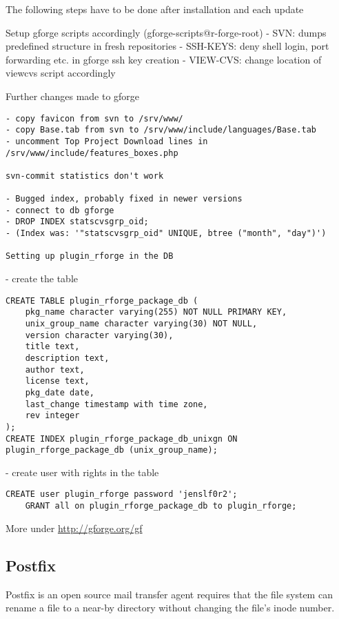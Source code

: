 \documentclass[a4paper]{article}
\begin{document}
The following steps have to be done after installation and each update

Setup gforge scripts accordingly (gforge-scripts@r-forge-root)
- SVN: dumps predefined structure in fresh repositories
- SSH-KEYS: deny shell login, port forwarding etc. in gforge ssh key creation
- VIEW-CVS: change location of viewcvs script accordingly

Further changes made to gforge
\begin{lstlisting}
- copy favicon from svn to /srv/www/
- copy Base.tab from svn to /srv/www/include/languages/Base.tab
- uncomment Top Project Download lines in /srv/www/include/features_boxes.php 

svn-commit statistics don't work

- Bugged index, probably fixed in newer versions
- connect to db gforge
- DROP INDEX statscvsgrp_oid;
- (Index was: '"statscvsgrp_oid" UNIQUE, btree ("month", "day")')

Setting up plugin_rforge in the DB
\end{lstlisting}
- create the table

\begin{lstlisting}[frame=single, framerule=0.95pt]
CREATE TABLE plugin_rforge_package_db (
    pkg_name character varying(255) NOT NULL PRIMARY KEY,
    unix_group_name character varying(30) NOT NULL,
    version character varying(30),
    title text,
    description text,
    author text,
    license text,
    pkg_date date,
    last_change timestamp with time zone,
    rev integer
);
CREATE INDEX plugin_rforge_package_db_unixgn ON plugin_rforge_package_db (unix_group_name);
\end{lstlisting}

- create user with rights in the table

\begin{lstlisting}[frame=single, framerule=0.95pt]
    CREATE user plugin_rforge password 'jenslf0r2';
    GRANT all on plugin_rforge_package_db to plugin_rforge;
\end{lstlisting}

\par More under \url{http://gforge.org/gf}

\subsection{Postfix}
Postfix is an open source mail transfer agent requires that the file system can rename a file to a near-by
directory without changing the file's inode number.
\end{document}
